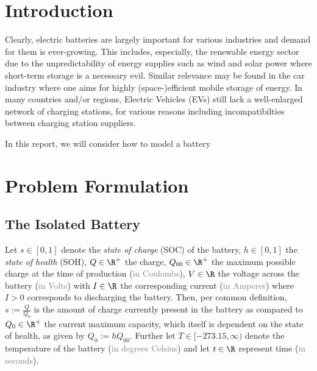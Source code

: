 \documentclass{prettytex/ox/mmsc-special-topic}
\title{\topictitle}
\author{Candidate \candidatenumber}
\date{\today}
\begin{document}
  \pagestyle{plain}
  \mmscSpecialHeader[casestudy]

  \begin{abstract}
    \label{abstract}
    This work will attempt to

  \end{abstract}

  \tableofcontents

  \pagebreak
  \pagestyle{normal}

  \section{Introduction}
  Clearly, electric batteries are largely important for various industries and demand for them is ever-growing.
  This includes, especially, the renewable energy sector due to the unpredictability of energy supplies such as wind and solar power where short-term storage is a necessary evil.
  Similar relevance may be found in the car industry where one aims for highly (space-)efficient mobile storage of energy.
  In many countries and/or regions, Electric Vehicles (EVs) still lack a well-enlarged network of charging stations, for various reasons including incompatibilties between charging station suppliers.

  In this report, we will consider how to model a battery

  \section{Problem Formulation}
  \subsection{The Isolated Battery}
  Let
  $s \in [0, 1]$ denote the \textit{state of charge} (SOC) of the battery,
  $h \in [0, 1]$ the \textit{state of health} (SOH),
  $Q \in \R^+$ the charge,
  $Q_{00} \in \R^+$ the maximum possible charge at the time of production (\textcolor{gray}{in Coulombs}),
  $V \in \R$ the voltage across the battery (\textcolor{gray}{in Volts}) with
  $I \in \R$ the corresponding current (\textcolor{gray}{in Amperes}) where $I > 0$ corresponds to discharging the battery.
  Then, per common definition, $s := \frac{Q}{Q_0}$ is the amount of charge currently present in the battery as compared to $Q_0 \in \R^+$ the current maximum capacity, which itself is dependent on the state of health, as given by $Q_0 := h Q_{00}$.
  Further let
  $T \in [-273.15, \infty)$ denote the temperature of the battery (\textcolor{gray}{in degrees Celsius}) and
  let $t \in \R$ represent time (\textcolor{gray}{in seconds}).
\end{document}
